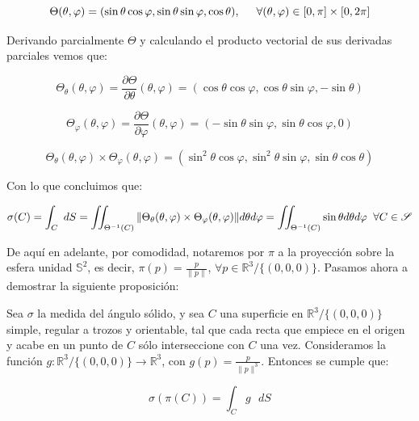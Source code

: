 $$\Theta(\theta ,\varphi ) = ( \sin \theta \cos \varphi,  \sin \theta \sin \varphi , \cos \theta),\hspace{0.5cm}  \forall (\theta , \varphi)\in [0,\pi ]\times [0,2\pi ]$$

Derivando parcialmente $\Theta$ y calculando el producto vectorial de sus derivadas parciales vemos que:

$$\Theta _\theta(\theta ,\varphi ) = \frac{\partial \Theta}{\partial \theta}(\theta ,\varphi ) = (\cos\theta\cos\varphi, \cos\theta\sin\varphi, -\sin\theta)$$

$$\Theta _\varphi(\theta ,\varphi ) = \frac{\partial \Theta}{\partial \varphi}(\theta ,\varphi ) = (-\sin\theta\sin\varphi, \sin\theta\cos\varphi, 0)$$

$$\Theta _\theta(\theta ,\varphi )\times \Theta _\varphi(\theta ,\varphi ) = (\sin^2\theta\cos\varphi,\sin^2\theta\sin\varphi,\sin\theta\cos\theta)$$

Con lo que concluimos que:

$$\sigma (C) = \int_C \text{ }dS = \iint_{\Theta^{-1}(C)}\|\Theta _\theta(\theta ,\varphi )\times \Theta _\varphi(\theta ,\varphi )\| d\theta d\varphi = \iint_{\Theta^{-1}(C)} \sin\theta d\theta d\varphi \hspace{0.2cm} \forall C \in \mathscr{S}$$

De aquí en adelante, por comodidad, notaremos por $\pi$ a la proyección sobre la esfera unidad $\mathds{S}^2$, es decir, $\pi(p)=\frac{p}{\|p\|}$, $\forall p \in \mathds{R}^3/\{(0,0,0)\}$. Pasamos ahora a demostrar la siguiente proposición:

\begin{proposicion}
  Sea $\sigma$ la medida del ángulo sólido, y sea $C$ una superficie en $\mathds{R}^3/\{(0,0,0)\}$ simple, regular a trozos y orientable, tal que cada recta que empiece en el origen y acabe en un punto de $C$ sólo interseccione con $C$ una vez. Consideramos la función $g:\mathds{R}^3/\{(0,0,0)\} \rightarrow \mathds{R}^3$, con $g(p)=\frac{p}{\|p\|^3}$. Entonces se cumple que:

 \begin{equation}
 \sigma (\pi(C)) = \int _C g \text{ }dS 
 \end{equation}
 
\end{proposicion}


